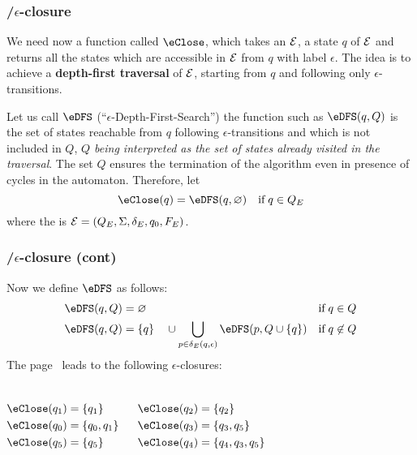 % 
\begin{frame}
\frametitle{\eNFA{}/\(\epsilon\)-closure}

We need now a function called \textbf{\(\eClose\)}, which takes an
\eNFA \(\cal E\), a state \(q\) of \(\cal E\) and returns all the
states which are accessible in \(\cal E\) from \(q\) with label
\(\epsilon\). The idea is to achieve a \textbf{depth-first traversal}
of \(\cal E\), starting from \(q\) and following only
\(\epsilon\)-transitions.

\bigskip

Let us call \(\eDFS\) (``\(\epsilon\)-Depth-First-Search'') the
function such as \(\eDFS(q, Q)\) is the set of states reachable from
\(q\) following \(\epsilon\)-transitions and which is not included in
\(Q\), \emph{\(Q\) being interpreted as the set of states already
  visited in the traversal}. The set \(Q\) ensures the termination of
the algorithm even in presence of cycles in the automaton. Therefore,
let
\[
\eClose (q) = \eDFS (q, \varnothing) \quad \text{if} \; q \in Q_E
\]
where the \eNFA is \({\cal E} = (Q_E, \Sigma, \delta_E, q_0, F_E)\).

\end{frame}

% 
\begin{frame}
\frametitle{\eNFA{}/\(\epsilon\)-closure (cont)}

Now we define \(\eDFS\) as follows:
\begin{align}
   \eDFS (q, Q) 
&= \varnothing 
& \text{if} \; q \in Q \label{eDFS_1}\\
  \eDFS (q, Q) 
&= \{q\} \quad \cup \bigcup_{p \in \delta_E(q,\epsilon)}{\eDFS (p, Q
    \cup \{q\})}
& \text{if} \; q \not\in Q \label{eDFS_2}
\end{align}
The \eNFA page~\pageref{enfa_num} leads to the
following \(\epsilon\)-closures:
\begin{columns}
  \begin{align*}
    \eClose (q_1) &= \{q_1\}\\
    \eClose (q_0) &= \{q_0, q_1\}\\
    \eClose (q_5) &= \{q_5\}
  \end{align*}

  \begin{align*}
    \eClose (q_2) &= \{q_2\}\\
    \eClose (q_3) &= \{q_3, q_5\}\\
    \eClose (q_4) &= \{q_4, q_3, q_5\}
  \end{align*}
\end{columns}

\end{frame}

